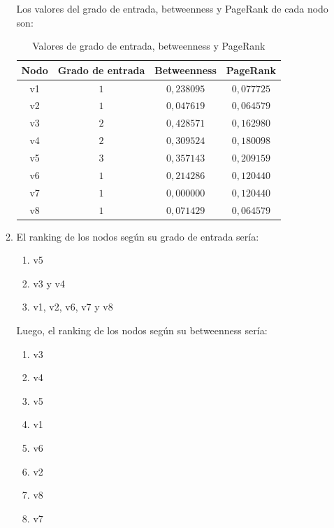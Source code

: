 \documentclass[12pt]{article}
\begin{document}
\begin{enumerate}
\begin{enumerate}
        Los valores del grado de entrada, betweenness y PageRank de cada nodo son:
        
        \begin{table}[H]
            \centering
            \begin{tabular}{|c|c|c|c|}
            \hline
            Nodo & Grado de entrada & Betweenness & PageRank \\ \hline
            v1 & $1$ & $0,238095$ & $0,077725$ \\ \hline
            v2 & $1$ & $0,047619$ & $0,064579$ \\ \hline
            v3 & $2$ & $0,428571$ & $0,162980$ \\ \hline
            v4 & $2$ & $0,309524$ & $0,180098$ \\ \hline
            v5 & $3$ & $0,357143$ & $0,209159$ \\ \hline
            v6 & $1$ & $0,214286$ & $0,120440$ \\ \hline
            v7 & $1$ & $0,000000$ & $0,120440$ \\ \hline
            v8 & $1$ & $0,071429$ & $0,064579$ \\ \hline
            \end{tabular}
            \caption{Valores de grado de entrada, betweenness y PageRank}
            \label{tab:values_red_chica}
        \end{table}

        \item El ranking de los nodos según su grado de entrada sería:
        \begin{enumerate}
            \item v5
            \item v3 y v4
            \item v1, v2, v6, v7 y v8
        \end{enumerate}

        Luego, el ranking de los nodos según su betweenness sería:
        \begin{enumerate}
            \item v3
            \item v4
            \item v5
            \item v1
            \item v6
            \item v2
            \item v8
            \item v7
        \end{enumerate}


\end{enumerate}
\end{enumerate}
\end{document}

